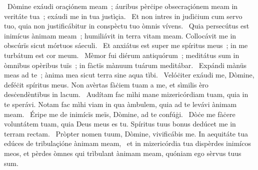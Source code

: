 \psalmChapterWithInscription{}
{ }
{%
~Dòmine exáudi oraçiónem meam~; áuribus pèrċipe obsecraçiónem meam in veritáte tua~; exáudi me in tua justìçia. 
~Et non intres in judìċium cum servo tuo, quia non justificábitur in conspèctu tuo òmnis vívens. 
~Quia persecútus est inimícus ànimam meam~; humiliávit in terra vitam meam. Collocávit me in obscúrïs sicut mórtuos sáeculi. 
~Et anxiátus est super me spíritus meus~; in me turbátum est cor meum. 
~Mèmor fui diérum antiquórum~; meditátus sum in òmnibus opèribus tuïs~; in fàctïs mànuum tuárum meditábar. 
~Expándi mànüs meas ad te~; ànima mea sicut terra sine aqua tìbi. 
~Velóċiter exáudi me, Dòmine, deféċit spíritus meus. Non avèrtas fàċiem tuam a me, et sìmilis èro desċendèntibus in lacum. 
~Audítam fac mìhi mane mizericórdiam tuam, quia in te sperávi. Notam fac mìhi viam in qua àmbulem, quia ad te levávi ànimam meam. 
~Éripe me de inimícïs meïs, Dòmine, ad te confúġi. 
~Dòċe me fàċere voluntátem tuam, quia Deus meus es tu. Spíritus tuus bonus dedúcet me in terram rectam. 
~Pròpter nomen tuum, Dòmine, vivificábis me. In aequitáte tua edúces de tribulaçióne ànimam meam, 
~et in mizericórdia tua dispèrdes inimícos meos, et pèrdes òmnes qui trìbulant ànimam meam, quóniam ego sèrvus tuus sum. 
}
